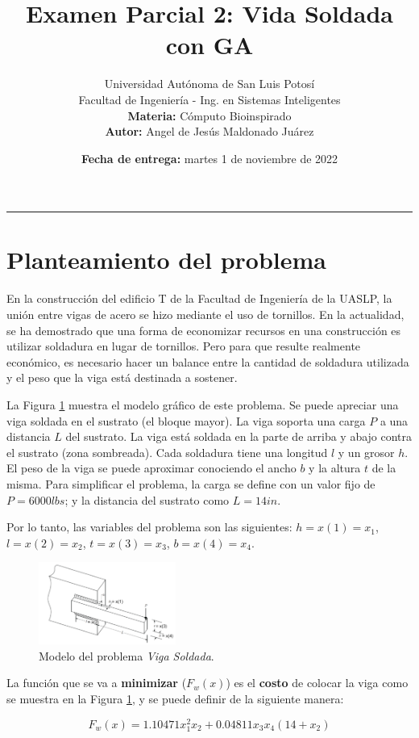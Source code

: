\documentclass[a4paper, 12pt]{article}
\title{\vspace{-3cm}Examen Parcial 2: Vida Soldada con GA}
\author{
    Universidad Autónoma de San Luis Potosí\\
    Facultad de Ingeniería - Ing. en Sistemas Inteligentes\\
    \textbf{Materia:} Cómputo Bioinspirado\\
    \textbf{Autor:} Angel de Jesús Maldonado Juárez
}
\date{\textbf{Fecha de entrega:} martes 1 de noviembre de 2022}
\begin{document}
\maketitle

\hrule

\section{Planteamiento del problema}
En la construcción del edificio T de la Facultad de Ingeniería de la UASLP, la unión entre vigas de acero se hizo mediante el uso de tornillos. En la actualidad, se ha demostrado que una forma de economizar recursos en una construcción es utilizar soldadura en lugar de tornillos. Pero para que resulte realmente económico, es necesario hacer un balance entre la cantidad de soldadura utilizada y el peso que la viga está destinada a sostener.

La Figura \ref{fig:1} muestra el modelo gráfico de este problema. Se puede apreciar una viga soldada en el sustrato (el bloque mayor). La viga soporta una carga $P$ a una distancia $L$ del sustrato. La viga está soldada en la parte de arriba y abajo contra el sustrato (zona sombreada). Cada soldadura tiene una longitud $l$ y un grosor $h$. El peso de la viga se puede aproximar conociendo el ancho $b$ y la altura $t$ de la misma. Para simplificar el problema, la carga se define con un valor fijo de $P=6000lbs$; y la distancia del sustrato como $L=14in$.

Por lo tanto, las variables del problema son las siguientes: $h=x(1)=x_1$, $l=x(2)=x_2$, $t=x(3)=x_3$, $b=x(4)=x_4$.

\begin{figure}[!ht]
    \centering
    \includegraphics[width=0.4\textwidth]{img/modelo_problema.png}
    \caption{Modelo del problema \emph{Viga Soldada}.}
    \label{fig:1}
\end{figure}

La función que se va a \textbf{minimizar} ($F_w(x)$) es el \textbf{costo} de colocar la viga como se muestra en la Figura \ref{fig:1}, y se puede definir de la siguiente manera:

\begin{equation}
    F_w(x)=1.10471x^2_1x_2+0.04811x_3x_4(14+x_2)
\end{equation}
\end{document}
